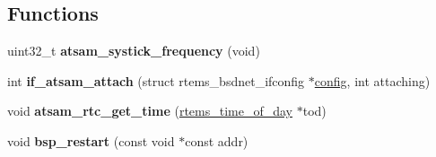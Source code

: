 \subsection*{Functions}
\begin{DoxyCompactItemize}
\item 
\mbox{\label{group__RTEMSBSPsARMAtsam_ga138ddd5d4173f0c89a6cb41ec03badaf}} 
uint32\+\_\+t {\bfseries atsam\+\_\+systick\+\_\+frequency} (void)
\item 
\mbox{\label{group__RTEMSBSPsARMAtsam_gad3ee9c81522d3b716848165354aaf25b}} 
int {\bfseries if\+\_\+atsam\+\_\+attach} (struct rtems\+\_\+bsdnet\+\_\+ifconfig $\ast$\mbox{\hyperlink{structconfig__s}{config}}, int attaching)
\item 
\mbox{\label{group__RTEMSBSPsARMAtsam_gad3552cd987f5aeeb12d868494234407c}} 
void {\bfseries atsam\+\_\+rtc\+\_\+get\+\_\+time} (\mbox{\hyperlink{structrtems__time__of__day}{rtems\+\_\+time\+\_\+of\+\_\+day}} $\ast$tod)
\item 
\mbox{\label{group__RTEMSBSPsARMAtsam_ga6b44a3646d7c3476a7214d3fd59e978b}} 
void {\bfseries bsp\+\_\+restart} (const void $\ast$const addr)
\end{DoxyCompactItemize}
